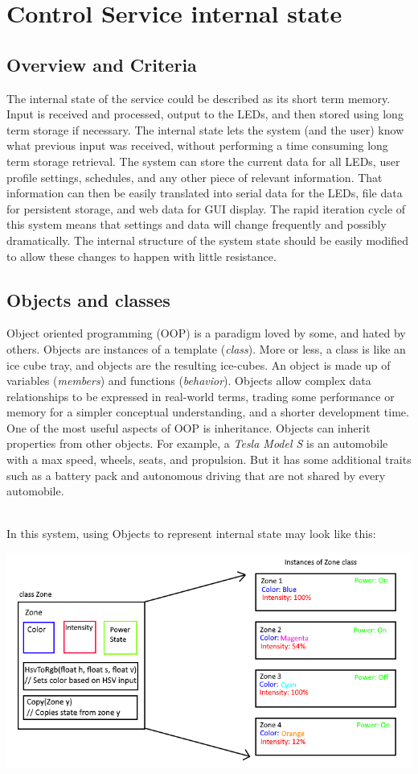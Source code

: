 \documentclass[onecolumn, draftclsnofoot,10pt, compsoc]{IEEEtran}
\begin{document}
		\section{Control Service internal state}
			\subsection{Overview and Criteria}
			The internal state of the service could be described as its short term memory.
			Input is received and processed, output to the LEDs, and then stored using long term storage if necessary.
			The internal state lets the system (and the user) know what previous input was received, without performing a time consuming long term storage retrieval.
			The system can store the current data for all LEDs, user profile settings, schedules, and any other piece of relevant information.
			That information can then be easily translated into serial data for the LEDs, file data for persistent storage, and web data for GUI display.
			The rapid iteration cycle of this system means that settings and data will change frequently and possibly dramatically.
			The internal structure of the system state should be easily modified to allow these changes to happen with little resistance.


			\subsection{Objects and classes}
			Object oriented programming (OOP) is a paradigm loved by some, and hated by others.
			Objects are instances of a template (\textit{class}). More or less, a class is like an ice cube tray, and objects are the resulting ice-cubes.
			An object is made up of variables (\textit{members}) and functions (\textit{behavior}).
			Objects allow complex data relationships to be expressed in real-world terms, trading some performance or memory for a simpler conceptual understanding, and a shorter development time.
			One of the most useful aspects of OOP is inheritance. Objects can inherit properties from other objects.
			For example, a \textit{Tesla Model S} is an automobile with a max speed, wheels, seats, and propulsion. But it has some additional traits such as a battery pack and autonomous driving that are not shared by every automobile.

			\noindent \\In this system, using Objects to represent internal state may look like this:

			\includegraphics[width=\linewidth]{objectsDiag.png}
\end{document}
